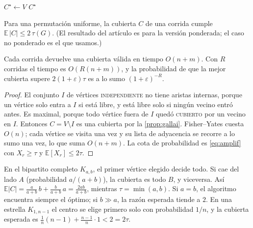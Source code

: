 \begin{algorithm}[!htbp]
\caption{$(G, R)$ (Veldt); con $R>1$ es Monte Carlo}\label{alg:rmis}
$C^\star\gets V$\;
\Return $C^\star$\;
\end{algorithm}

\begin{theorem}\label{thm:veldt}
Para una permutación uniforme, la cubierta $C$ de una corrida cumple $\mathbb E\,|C|\le 2\,\tau(G)$. (El resultado del artículo es para la versión ponderada; el caso no ponderado es el que usamos.)
\end{theorem}

\begin{proposition}
Cada corrida devuelve una cubierta válida en tiempo $O(n+m)$. Con $R$ corridas el tiempo es $O(R(n+m))$, y la probabilidad de que la mejor cubierta supere $2(1+\varepsilon)\tau$ es a lo sumo $(1+\varepsilon)^{-R}$.
\end{proposition}
\begin{proof}
El conjunto $I$ de vértices \textsc{independiente} no tiene aristas internas, porque un vértice solo entra a $I$ si está libre, y está libre solo si ningún vecino entró antes. Es maximal, porque todo vértice fuera de $I$ quedó \textsc{cubierto} por un vecino en $I$. Entonces $C=V\setminus I$ es una cubierta por la \cref{prop:gallai}. Fisher--Yates cuesta $O(n)$; cada vértice se visita una vez y su lista de adyacencia se recorre a lo sumo una vez, lo que suma $O(n+m)$. La cota de probabilidad es \eqref{eq:amplif} con $X_r\ge\tau$ y $\mathbb E[X_r]\le 2\tau$.
\end{proof}

\begin{example}
En el bipartito completo $K_{a,b}$, el primer vértice elegido decide todo. Si cae del lado $A$ (probabilidad $a/(a+b)$), la cubierta es todo $B$, y viceversa. Así $\mathbb E|C|=\frac{a}{a+b}\,b+\frac{b}{a+b}\,a=\frac{2ab}{a+b}$, mientras $\tau=\min(a,b)$. Si $a=b$, el algoritmo encuentra siempre el óptimo; si $b\gg a$, la razón esperada tiende a $2$. En una estrella $K_{1,n-1}$ el centro se elige primero solo con probabilidad $1/n$, y la cubierta esperada es $\frac1n(n-1)+\frac{n-1}{n}\cdot1<2=2\tau$.
\end{example}

